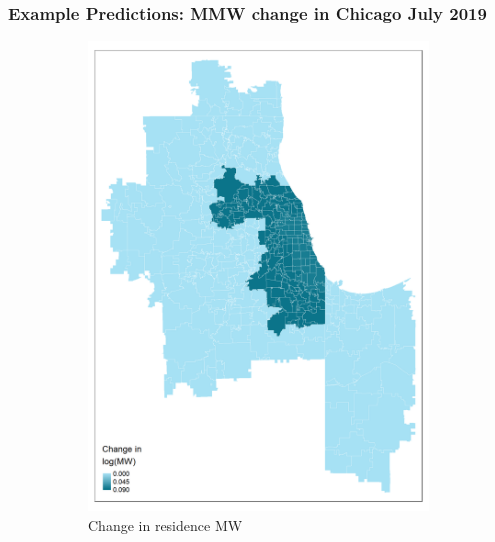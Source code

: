 \documentclass[aspectratio=169, t]{beamer}
\begin{document}
\begin{frame}[label = example_pred_chi_07_2019]
	\frametitle{Example Predictions: MMW change in Chicago July 2019}
	
	\begin{figure}
		\begin{subfigure}{0.33\textwidth}
			\includegraphics[width = 0.99\textwidth]{maps_events/output/chicago_2019-6_actual_mw.png}
			\caption*{Change in residence MW}
		\end{subfigure}%
		\begin{subfigure}{0.33\textwidth}

\end{subfigure}
\end{figure}
\end{frame}
\end{document}
